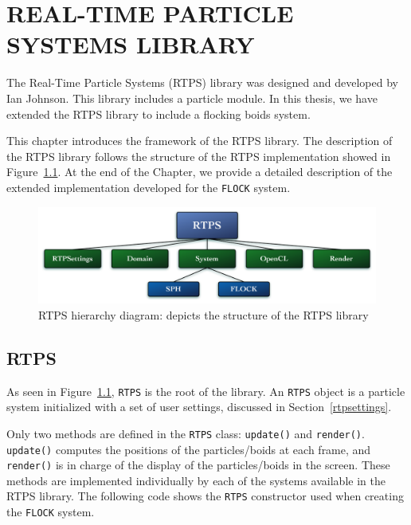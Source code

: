 \chapter{REAL-TIME PARTICLE SYSTEMS LIBRARY}\label{RTPSchapter}

The Real-Time Particle Systems (RTPS) library was designed and developed by Ian Johnson\cite{ianPaper}. This library includes a particle module. In this thesis, we have extended the RTPS library to include a flocking boids system. 

This chapter introduces the framework of the RTPS library. The description of the RTPS library follows the structure of the RTPS implementation showed in Figure~\ref{RTPSdiagram}. At the end of the Chapter, we provide a detailed description of the extended implementation developed for the \texttt{FLOCK} system.

\begin{figure}[htbp]
\begin{center}
\includegraphics[scale=0.38]{figures/RTPSdiagramMyrna.pdf}
\caption{RTPS hierarchy diagram: depicts the structure of the RTPS library}
\label{RTPSdiagram}
\end{center}
\end{figure}

\section{RTPS}\label{rtpssection}
As seen in Figure~\ref{RTPSdiagram}, \texttt{RTPS} is the root of the library. An \texttt{RTPS} object is a particle system initialized with a set of user settings,  discussed in Section~\ref{rtpsettings}. 

Only two methods are defined in the \texttt{RTPS} class: \texttt{update()} and \texttt{render()}. \texttt{update()} computes the positions of the particles/boids at each frame, and \texttt{render()} is in charge of the display of the particles/boids in the screen. These methods are implemented individually by each of the systems available in the RTPS library. The following code shows the \texttt{RTPS} constructor used when creating the \texttt{FLOCK} system.

